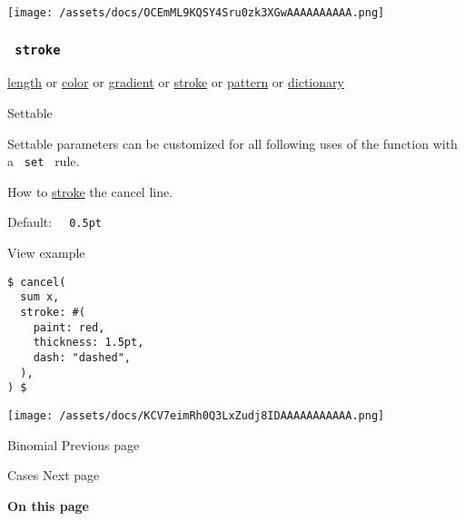 \texttt{[image: /assets/docs/OCEmML9KQSY4Sru0zk3XGwAAAAAAAAAA.png]}

\subsubsection{\texorpdfstring{\texttt{\ stroke\ }}{ stroke }}\label{parameters-stroke}

\href{/docs/reference/layout/length/}{length} {or}
\href{/docs/reference/visualize/color/}{color} {or}
\href{/docs/reference/visualize/gradient/}{gradient} {or}
\href{/docs/reference/visualize/stroke/}{stroke} {or}
\href{/docs/reference/visualize/pattern/}{pattern} {or}
\href{/docs/reference/foundations/dictionary/}{dictionary}

{{ Settable }}

\label{parameters-stroke-settable-tooltip}
Settable parameters can be customized for all following uses of the
function with a \texttt{\ set\ } rule.

How to \href{/docs/reference/visualize/stroke/}{stroke} the cancel line.

Default: \texttt{\ }{\texttt{\ 0.5pt\ }}\texttt{\ }


View example

\begin{verbatim}
$ cancel(
  sum x,
  stroke: #(
    paint: red,
    thickness: 1.5pt,
    dash: "dashed",
  ),
) $
\end{verbatim}

\texttt{[image: /assets/docs/KCV7eimRh0Q3LxZudj8IDAAAAAAAAAAA.png]}

\href{/docs/reference/math/binom/}{\pandocbounded{}}

{ Binomial } { Previous page }

\href{/docs/reference/math/cases/}{\pandocbounded{}}

{ Cases } { Next page }

\textbf{On this page}

